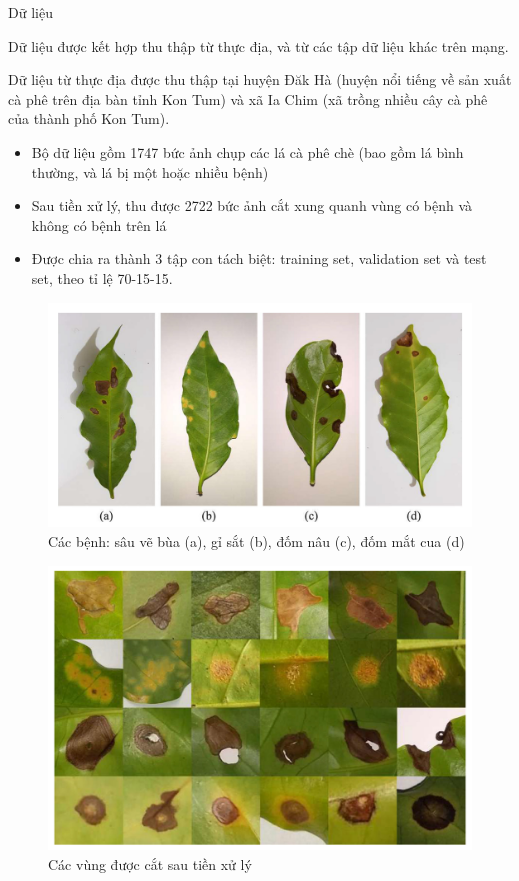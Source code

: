 \documentclass{beamer}
\begin{document}
\begin{frame}[allowframebreaks]{Dữ liệu}

	Dữ liệu được kết hợp thu thập từ thực địa, và từ các tập dữ liệu khác trên mạng.
	
	\null
	
	Dữ liệu từ thực địa được thu thập tại huyện Đăk Hà (huyện nổi tiếng về sản xuất cà phê trên địa bàn tỉnh Kon Tum) và xã Ia Chim (xã trồng nhiều cây cà phê của thành phố Kon Tum).

	\framebreak

	\begin{itemize}
		\item Bộ dữ liệu gồm 1747 bức ảnh chụp các lá cà phê chè (bao gồm lá bình thường, và lá bị một hoặc nhiều bệnh)
		\item Sau tiền xử lý, thu được 2722 bức ảnh cắt xung quanh vùng có bệnh và không có bệnh trên lá
		\item Được chia ra thành 3 tập con tách biệt: training set, validation set và test set, theo tỉ lệ 70-15-15.
	\end{itemize}

	\framebreak

	\begin{figure}[H]
		\includegraphics[scale=0.25]{images/image1}
		\caption{Các bệnh: sâu vẽ bùa (a), gỉ sắt (b), đốm nâu (c), đốm mắt cua (d)}
	\end{figure}

	\framebreak
	
	\begin{figure}[H]
		\includegraphics[scale=0.35]{images/image3}
		\caption{Các vùng được cắt sau tiền xử lý}
	\end{figure}


\end{frame}
\end{document}
